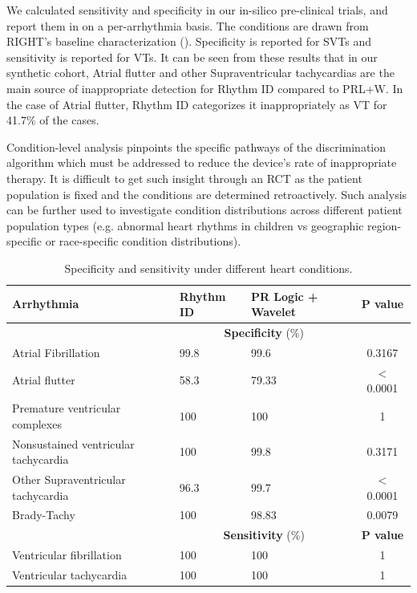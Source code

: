 We calculated sensitivity and specificity in our in-silico pre-clinical trials, and report them in  on a per-arrhythmia basis.
The conditions are drawn from RIGHT's baseline characterization (\cite{GoldABBTB11_RIGHTresults}).
Specificity is reported for SVTs and sensitivity is reported for VTs.
It can be seen from these results that in our synthetic cohort, Atrial flutter and other Supraventricular tachycardias are the main source of inappropriate detection for Rhythm ID compared to PRL+W.
In the case of Atrial flutter, Rhythm ID categorizes it inappropriately as VT for 41.7\% of the cases.

Condition-level analysis pinpoints the specific pathways of the discrimination algorithm which must be addressed to reduce the device's rate of inappropriate therapy. It is difficult to get such insight through an RCT as the patient population is fixed and the conditions are determined retroactively. Such analysis can be further used to investigate condition distributions across different patient population types (e.g. abnormal heart rhythms in children vs geographic region-specific or race-specific condition distributions).   

\begin{table}[t]
\center
\begin{tabular}{|p{2.8cm}|p{1.5cm}|p{1.5cm}|c|}
	\hline Arrhythmia & Rhythm ID & PR Logic + Wavelet  & P value \\ 
	\hline &	\multicolumn{2}{|c|}{\textbf{Specificity} (\%)}& \\
	\hline Atrial Fibrillation & 99.8 & 99.6 & 0.3167 \\ 
	\hline \cellcolor{blue!25} Atrial flutter & 58.3 & 79.33 & $<$ 0.0001 \\ 
	\hline Premature ventricular complexes & 100 & 100 & 1 \\ 
	\hline Nonsustained ventricular tachycardia & 100 & 99.8 & 0.3171 \\ 
	\hline \cellcolor{blue!25} Other Supraventricular tachycardia & 96.3 & 99.7 & $<$ 0.0001 \\ 
	\hline Brady-Tachy & 100 & 98.83 & 0.0079 \\ 
		\hline
	\hline &	\multicolumn{2}{|c|}{\textbf{Sensitivity} (\%)} & \textbf{P value}\\
	\hline Ventricular fibrillation & 100 & 100 & 1 \\ 
	\hline Ventricular tachycardia & 100 & 100 & 1 \\ 
	\hline 
\end{tabular} 
\caption{Specificity and sensitivity under different heart conditions.
}
\label{tab:vtsvt}
\end{table}

